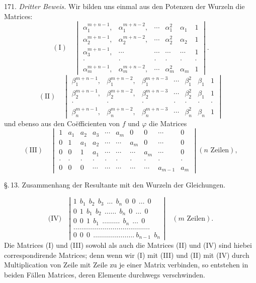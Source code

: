 \documentclass[11pt]{article}
\providecommand{\weberpage}[1]{}
\begin{document}
171. \textit{Dritter Beweis.} Wir bilden uns einmal aus den Potenzen der
Wurzeln die Matrices:
\[
(\mathrm{I}) \quad
\begin{vmatrix}
\alpha_1^{m+n-1}, & \alpha_1^{m+n-2}, & \cdots & \alpha_1^2 & \alpha_1 & 1 \\
\alpha_2^{m+n-1}, & \alpha_2^{m+n-2}, & \cdots & \alpha_2^2 & \alpha_2 & 1 \\
\alpha_3^{m+n-1}, & \cdots & \cdots & \cdots & \cdots & 1 \\
\cdot & \cdot & \cdot & \cdot & \cdot & \cdot \\
\alpha_m^{m+n-1}, & \alpha_m^{m+n-2}, & \cdots & \alpha_m^2 & \alpha_m & 1
\end{vmatrix}.
\]
\[
(\mathrm{II}) \quad
\begin{vmatrix}
\beta_1^{m+n-1}, & \beta_1^{m+n-2}, & \beta_1^{m+n-3} & \cdots & \beta_1^2 & \beta_1 & 1 \\
\beta_2^{m+n-1}, & \beta_2^{m+n-2}, & \beta_2^{m+n-3} & \cdots & \beta_2^2 & \beta_1 & 1 \\
\cdot & \cdot & \cdot & \cdot & \cdot & \cdot & \cdot \\
\beta_n^{m+n-1}, & \beta_n^{m+n-2}, & \beta_n^{m+n-3} & \cdots & \beta_n^2 & \beta_n & 1
\end{vmatrix}
\]
und ebenso aus den Coëfficienten von $f$ und $\varphi$ die Matrices
\[
(\mathrm{III}) \quad
\begin{vmatrix}
1 & a_1 & a_2 & a_3 & \cdots & a_m & 0 & 0 & \cdots & 0 \\
0 & 1 & a_1 & a_2 & \cdots & \cdots & a_m & 0 & \cdots & 0 \\
0 & 0 & 1 & a_1 & \cdots & \cdots & \cdots & a_m & \cdots & 0 \\
\cdot & \cdot & \cdot & \cdot & \cdot & \cdot & \cdot & \cdot & \cdot & \cdot \\
0 & 0 & 0 & \cdots & \cdots & \cdots & \cdots & \cdots & a_{m-1} & a_m
\end{vmatrix}
(n \text{ Zeilen}),
\]


\weberpage{183}
\S.\,13. Zusammenhang der Resultante mit den Wurzeln der Gleichungen.

\[
\text{(IV)}\quad
\left|\begin{array}{l}
1\ \ b_1\ \ b_2\ \ b_3\ \ \ldots\ \ b_n\ \ 0\ \ 0\ \ \ldots\ \ 0\\
0\ \ 1\ \ b_1\ \ b_2\ \ \ldots\ldots\ \ b_n\ \ 0\ \ \ldots\ \ 0\\
0\ \ 0\ \ 1\ \ b_1\ \ \ldots\ldots\ldots\ \ b_n\ \ \ldots\ \ 0\\
\ldots\ldots\ldots\ldots\ldots\ldots\ldots\ldots\ldots\ldots\ldots\ldots\ldots\\
0\ \ 0\ \ 0\ \ \ldots\ldots\ldots\ldots\ldots\ldots\ldots\ b_{n-1}\ \ b_n
\end{array}\right|
\quad (m\text{ Zeilen}).
\]
Die Matrices (I) und (III) sowohl als auch die Matrices (II) und (IV)
sind hiebei correspondirende Matrices; denn wenn wir (I) mit (III)
und (II) mit (IV) durch Multiplication von Zeile mit Zeile zu je einer
Matrix verbinden, so entstehen in beiden Fällen Matrices, deren Elemente durchwegs verschwinden.
\end{document}
